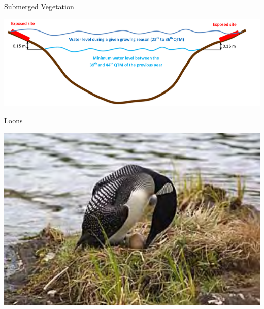 \documentclass[compress,english]{beamer}
\begin{document}
\begin{frame}{Submerged Vegetation}

\begin{center}
\includegraphics[width=0.8\paperwidth]{MorinVeg.png}
\end{center}

\end{frame}

\begin{frame}{Loons}

\begin{center}
\includegraphics[width=0.8\paperwidth]{MorinLoon.png}
\end{center}

\end{frame}
\end{document}
